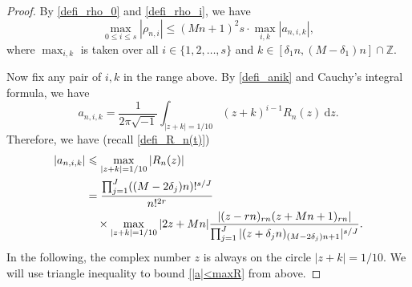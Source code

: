 \documentclass[12pt]{article}
\numberwithin{equation}{section}
\begin{document}
\begin{proof}
By \eqref{defi_rho_0} and \eqref{defi_rho_i}, we have
\begin{equation}\label{rho<a}
\max_{0 \leqslant i \leqslant s} |\rho_{n,i}| \leqslant (Mn+1)^{2}s \cdot \max_{i,k} |a_{n,i,k}|, 
\end{equation}
where $\max_{i,k}$ is taken over all $i \in \{ 1,2,\ldots,s \}$ and $k \in [\delta_1n, (M-\delta_1)n] \cap \mathbb{Z}$. 

Now fix any pair of $i,k$ in the range above. By \eqref{defi_anik} and Cauchy's integral formula, we have
\[ a_{n,i,k} = \frac{1}{2\pi \sqrt{-1}} \int_{|z+k|=1/10} (z+k)^{i-1}R_n(z)~\mathrm{d}z. \]
Therefore, we have (recall \eqref{defi_R_n(t)})
\begin{align}
|a_{n,i,k}| &\leqslant \max_{|z+k| = 1/10} |R_n(z)| \notag\\
&= \frac{\prod_{j=1}^{J} ((M-2\delta_j)n)!^{s/J}}{n!^{2r}}  \notag\\
&\quad  \times \max_{|z+k| = 1/10} |2z+Mn|  \frac{|(z-rn)_{rn} (z+Mn+1)_{rn}|}{ \prod_{j=1}^{J} |(z+\delta_jn)_{(M-2\delta_j)n+1}|^{s/J}}. \label{|a|<maxR}
\end{align}
In the following, the complex number $z$ is always on the circle $|z+k|=1/10$. We will use triangle inequality to bound \eqref{|a|<maxR} from above. 


\end{proof}
\end{document}
